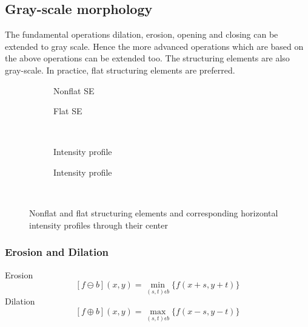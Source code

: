 \subsection{Gray-scale morphology}
The fundamental operations dilation, erosion, opening and closing can be extended to gray scale. Hence the more advanced operations which are based on the above operations can be extended too. The structuring elements are also gray-scale. In practice, flat structuring elements are preferred.

\begin{figure}[h!]
\centering
\begin{subfigure}[b]{0.45\textwidth}
\centering
{}
\caption{Nonflat SE}
\end{subfigure}
\begin{subfigure}[b]{0.45\textwidth}
\centering
{}
\caption{Flat SE}
\end{subfigure}\\
\begin{subfigure}[b]{0.45\textwidth}
\centering
{}
\caption{Intensity profile}
\end{subfigure}
\begin{subfigure}[b]{0.45\textwidth}
\centering
{}
\caption{Intensity profile}
\end{subfigure}\\
\caption{Nonflat and flat structuring elements and corresponding horizontal intensity profiles through their center}
\end{figure}
\subsubsection{Erosion and Dilation}
Erosion
\[
	[f\ominus b](x,y) = \min_{(s,t)\epsilon b} \{f(x+s,y+t)\}
\]
Dilation
\[
	[f\oplus b](x,y) = \max_{(s,t)\epsilon b} \{f(x-s,y-t)\}
\]
